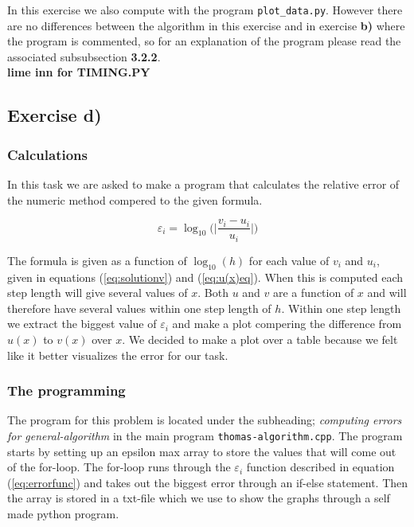 \documentclass{article}
\begin{document}
    In this exercise we also compute with the program \texttt{plot\_data.py}. However there are no differences between the algorithm in this exercise and in exercise \textbf{b)} where the program is commented, so for an explanation of the program please read the associated subsubsection \textbf{3.2.2}. \\

    {\large  \bf lime inn for TIMING.PY}


\subsection{Exercise d)}


  \subsubsection{Calculations}

    In this task we are asked to make a program that calculates the relative error of the numeric method compered to the given formula.

    \begin{equation}
      \varepsilon_i = \log_{10} \bigg( \bigg| \frac{v_i - u_i}{u_i} \bigg| \bigg)    \label{eq:errorfunc}
    \end{equation}

    The formula is given as a function of $\log_{10}(h)$ for each value of $v_i$ and $u_i$, given in equations (\ref{eq:solutionv}) and (\ref{eq:u(x)eq}). When this is computed each step length will give several values of $x$. Both $u$ and $v$ are a function of $x$ and will therefore have several values within one step length of $h$. Within one step length we extract the biggest value of $\varepsilon_i$ and make a plot compering the difference from $u(x)$ to $v(x)$ over $x$. We decided to make a plot over a table because we felt like it better visualizes the error for our task.


  \subsubsection{The programming}

    The program for this problem is located under the subheading; \textit{computing errors for general-algorithm} in the main program \texttt{thomas-algorithm.cpp}. The program starts by setting up an epsilon max array to store the values that will come out of the for-loop. The for-loop runs through the $\varepsilon_i$ function described in equation (\ref{eq:errorfunc}) and takes out the biggest error through an if-else statement. Then the array is stored in a txt-file which we use to show the graphs through a self made python program. \\
\end{document}
